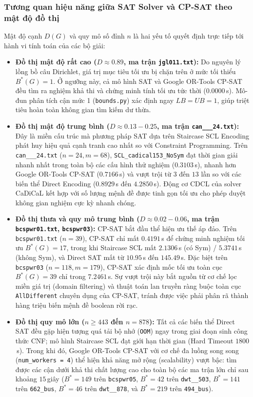 \documentclass[a4paper,fleqn]{cas-sc}
\begin{document}
\subsubsection{Tương quan hiệu năng giữa SAT Solver và CP-SAT theo mật độ đồ thị}
Mật độ cạnh $D(G)$ và quy mô số đỉnh $n$ là hai yếu tố quyết định trực tiếp tới hành vi tính toán của các bộ giải:
\begin{itemize}
    \item \textbf{Đồ thị mật độ rất cao ($D \approx 0.89$, ma trận \texttt{jgl011.txt}):} Do nguyên lý lồng bồ câu Dirichlet, giá trị mục tiêu tối ưu bị chặn trên ở mức tối thiểu $B^*(G) = 1$. Ở ngưỡng này, cả mô hình SAT và Google OR-Tools CP-SAT đều tìm ra nghiệm khả thi và chứng minh tính tối ưu tức thời ($0.0000$\,s). Mô-đun phân tích cận mức 1 (\texttt{bounds.py}) xác định ngay $LB = UB = 1$, giúp triệt tiêu hoàn toàn không gian tìm kiếm dư thừa.
    \item \textbf{Đồ thị mật độ trung bình ($D \approx 0.13 - 0.25$, ma trận \texttt{can\_\_\_24.txt}):} Đây là miền cấu trúc mà phương pháp SAT dựa trên Staircase SCL Encoding phát huy hiệu quả cạnh tranh cao nhất so với Constraint Programming. Trên \texttt{can\_\_\_24.txt} ($n=24, m=68$), \texttt{SCL\_cadical153\_NoSym} đạt thời gian giải nhanh nhất trong toàn bộ các cấu hình thử nghiệm ($0.3103$\,s), nhanh hơn Google OR-Tools CP-SAT ($0.7166$\,s) và vượt trội từ $3$ đến $13$ lần so với các biến thể Direct Encoding ($0.8929$\,s đến $4.2850$\,s). Động cơ CDCL của solver CaDiCaL kết hợp với số lượng mệnh đề được tinh gọn tối ưu cho phép duyệt không gian nghiệm cực kỳ nhanh chóng.
    \item \textbf{Đồ thị thưa và quy mô trung bình ($D \approx 0.02 - 0.06$, ma trận \texttt{bcspwr01.txt}, \texttt{bcspwr03}):} CP-SAT bắt đầu thể hiện ưu thế áp đảo. Trên \texttt{bcspwr01.txt} ($n=39$), CP-SAT chỉ mất $0.4191$\,s để chứng minh nghiệm tối ưu $B^*(G) = 17$, trong khi Staircase SCL mất $2.1306$\,s (có Sym) / $5.3741$\,s (không Sym), và Direct SAT mất từ $10.95$\,s đến $145.49$\,s. Đặc biệt trên \texttt{bcspwr03} ($n=118, m=179$), CP-SAT xác định mốc tối ưu toàn cục $B^*(G) = 39$ chỉ trong $7.2461$\,s. Sự vượt trội này bắt nguồn từ cơ chế lọc miền giá trị (domain filtering) và thuật toán lan truyền ràng buộc toàn cục \texttt{AllDifferent} chuyên dụng của CP-SAT, tránh được việc phải phân rã thành hàng triệu biến mệnh đề boolean rời rạc.
    \item \textbf{Đồ thị quy mô lớn ($n \ge 443$ đến $n = 878$):} Tất cả các biến thể Direct SAT đều gặp hiện tượng quá tải bộ nhớ (\texttt{OOM}) ngay trong giai đoạn sinh công thức CNF; mô hình Staircase SCL đạt giới hạn thời gian (Hard Timeout $1800$\,s). Trong khi đó, Google OR-Tools CP-SAT với cơ chế đa luồng song song (\texttt{num\_workers = 4}) thể hiện khả năng mở rộng (scalability) vượt bậc: tìm được các cận dưới khả thi chất lượng cao cho toàn bộ các ma trận lớn chỉ sau khoảng $15$\,giây ($B^* = 149$ trên \texttt{bcspwr05}, $B^* = 42$ trên \texttt{dwt\_\_503}, $B^* = 141$ trên \texttt{662\_bus}, $B^* = 46$ trên \texttt{dwt\_\_878}, và $B^* = 219$ trên \texttt{494\_bus}).
\end{itemize}
\end{document}
